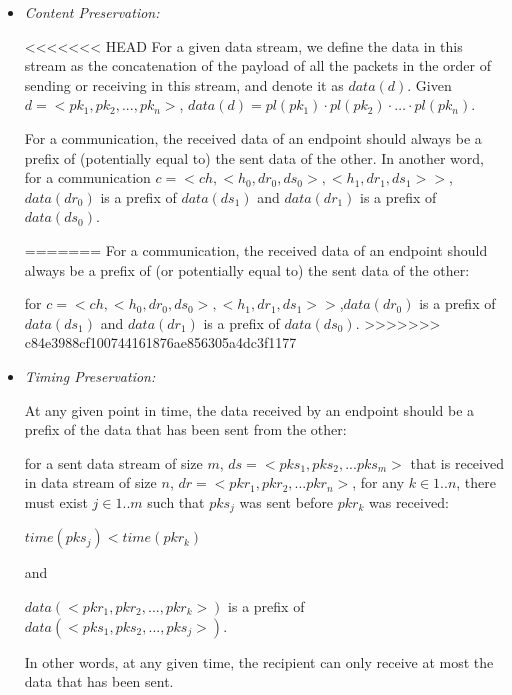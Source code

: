 \begin{itemize}
 \item \textit{Content Preservation:} 
 
<<<<<<< HEAD
 For a given data stream, we define the data in this stream as the concatenation of the payload of all the packets in the order of sending or receiving in this stream, and denote it as $data(d)$. Given $ d=<pk_1, pk_2, ..., pk_n>$, $data(d)=pl(pk_1) \cdot pl(pk_2)\cdot \ldots \cdot pl(pk_n)$.
 
 For a communication, the received data of an endpoint should always be a prefix of (potentially equal to) the sent data of the other. In another word, for a communication $c = <ch, <h_0, dr_0, ds_0>, <h_1, dr_1, ds_1>>$,$data(dr_0)$ is a prefix of $data(ds_1)$ and $data(dr_1)$ is a prefix of $data(ds_0)$.
 
=======
For a communication, the received data of an endpoint should always be a prefix of (or potentially equal to) the sent data of the other:

for $c = <ch, <h_0, dr_0, ds_0>, <h_1, dr_1, ds_1>>$,$data(dr_0)$ is a prefix of $data(ds_1)$ and $data(dr_1)$ is a prefix of $data(ds_0)$.
>>>>>>> c84e3988cf100744161876ae856305a4dc3f1177

 \item \textit{Timing Preservation:} 
 
At any given point in time, the data received by an endpoint should be a prefix of the data that has been sent from the other:
 
for a sent data stream of size $m$, $ds= <pks_1, pks_2, ... pks_m>$ that is received in data stream of size $n$, $dr = <pkr_1, pkr_2, ... pkr_n>$, for any $k \in {1..n}$, there must exist $j \in {1..m}$ such that $pks_j$ was sent before $pkr_k$ was received:

$time(pks_j) < time(pkr_k)$

and

$ data(<pkr_1, pkr_2, ..., pkr_k>)$ is a prefix of $data(<pks_1, pks_2, ..., pks_j>)$.

In other words, at any given time, the recipient can only receive at most the data that has been sent.

\end{itemize}

